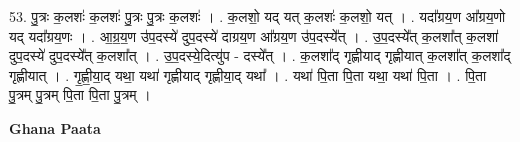 \documentclass[17pt]{extarticle}
\begin{document}
53. पु॒त्रः क॒लशः॑ क॒लशः॑ पु॒त्रः पु॒त्रः क॒लशः॑ । . क॒लशो॒ यद् यत् क॒लशः॑ क॒लशो॒ यत् । . यदा᳚ग्रय॒ण आ᳚ग्रय॒णो यद् यदा᳚ग्रय॒णः । . आ॒ग्र॒य॒ण उ॑प॒दस्ये॑ दुप॒दस्ये॑ दाग्रय॒ण आ᳚ग्रय॒ण उ॑प॒दस्ये᳚त् । . उ॒प॒दस्ये᳚त् क॒लशा᳚त् क॒लशा॑ दुप॒दस्ये॑ दुप॒दस्ये᳚त् क॒लशा᳚त् । . उ॒प॒दस्ये॒दित्यु॑प - दस्ये᳚त् । . क॒लशा᳚द् गृह्णीयाद् गृह्णीयात् क॒लशा᳚त् क॒लशा᳚द् गृह्णीयात् । . गृ॒ह्णी॒या॒द् यथा॒ यथा॑ गृह्णीयाद् गृह्णीया॒द् यथा᳚ । . यथा॑ पि॒ता पि॒ता यथा॒ यथा॑ पि॒ता । . पि॒ता पु॒त्रम् पु॒त्रम् पि॒ता पि॒ता पु॒त्रम् । \newline

\textbf{Ghana Paata } \newline
\end{document}
